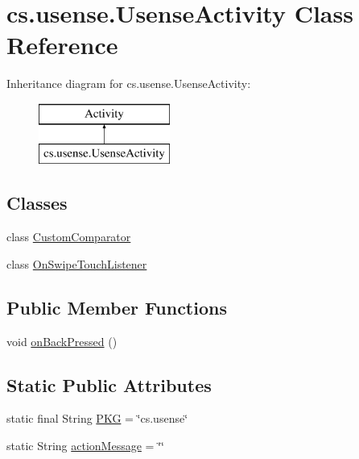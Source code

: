 \hypertarget{classcs_1_1usense_1_1_usense_activity}{}\section{cs.\+usense.\+Usense\+Activity Class Reference}
\label{classcs_1_1usense_1_1_usense_activity}
Inheritance diagram for cs.\+usense.\+Usense\+Activity\+:\begin{figure}[H]
\begin{center}
\leavevmode
\includegraphics[height=2.000000cm]{classcs_1_1usense_1_1_usense_activity}
\end{center}
\end{figure}
\subsection*{Classes}
\begin{DoxyCompactItemize}
\item 
class \hyperlink{classcs_1_1usense_1_1_usense_activity_1_1_custom_comparator}{Custom\+Comparator}
\item 
class \hyperlink{classcs_1_1usense_1_1_usense_activity_1_1_on_swipe_touch_listener}{On\+Swipe\+Touch\+Listener}
\end{DoxyCompactItemize}
\subsection*{Public Member Functions}
\begin{DoxyCompactItemize}
\item 
void \hyperlink{classcs_1_1usense_1_1_usense_activity_ad8212c2cb9b2fd90d7ee02358a7efa77}{on\+Back\+Pressed} ()
\end{DoxyCompactItemize}
\subsection*{Static Public Attributes}
\begin{DoxyCompactItemize}
\item 
static final String \hyperlink{classcs_1_1usense_1_1_usense_activity_aadee7e5d8c283dfae9005d3e2fd4fcd7}{P\+K\+G} = \char`\"{}cs.\+usense\char`\"{}
\item 
static String \hyperlink{classcs_1_1usense_1_1_usense_activity_ab6b1ca5ccc8b099baccc4bfd5bf7fed4}{action\+Message} = \char`\"{}\char`\"{}
\end{DoxyCompactItemize}
